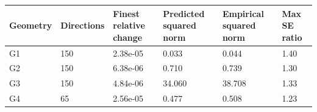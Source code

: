 \begin{tabular}{llllll}
\hline
Geometry & Directions & Finest relative change & Predicted squared norm & Empirical squared norm & Max SE ratio \\
\hline
G1 & 150 & 2.38e-05 & 0.033 & 0.044 & 1.40 \\
G2 & 150 & 6.38e-06 & 0.710 & 0.739 & 1.30 \\
G3 & 150 & 4.84e-06 & 34.060 & 38.708 & 1.33 \\
G4 & 65 & 2.56e-05 & 0.477 & 0.508 & 1.23 \\
\hline
\end{tabular}
